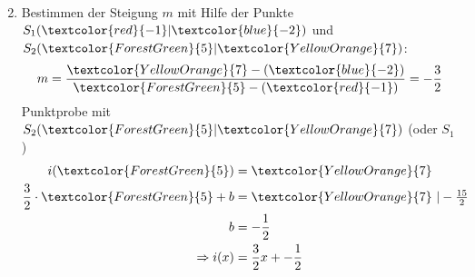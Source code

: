 \begin{Answer}[ref=punktprobeA2]
\begin{minipage}[t]{0.5\textwidth}
\begin{enumerate}[label=\alph*)]
\begin{align*}
			\end{align*}
			\item Bestimmen der Steigung $m$ mit Hilfe der Punkte $S_1(\textcolor{red}{-1}|\textcolor{blue}{-2})$ und $S_2(\textcolor{ForestGreen}{5}|\textcolor{YellowOrange}{7})$:
			\begin{align*}
				m=\dfrac{\textcolor{YellowOrange}{7}-\left(\textcolor{blue}{-2}\right)}{\textcolor{ForestGreen}{5}-\left(\textcolor{red}{-1}\right)}=-\dfrac{3}{2}
			\end{align*}
			Punktprobe mit $S_2(\textcolor{ForestGreen}{5}|\textcolor{YellowOrange}{7})$ (oder $S_1$)
			\begin{align*}
				i(\textcolor{ForestGreen}{5})&=\textcolor{YellowOrange}{7}\\
				\dfrac{3}{2}\cdot\textcolor{ForestGreen}{5}+b&=\textcolor{YellowOrange}{7}\ \rvert -\tfrac{15}{2}\\
				b&=-\dfrac{1}{2}\\
				\Rightarrow i(x)&=\dfrac{3}{2}x+-\dfrac{1}{2}
			\end{align*}
		\end{enumerate}
	\end{minipage}
\end{Answer}
